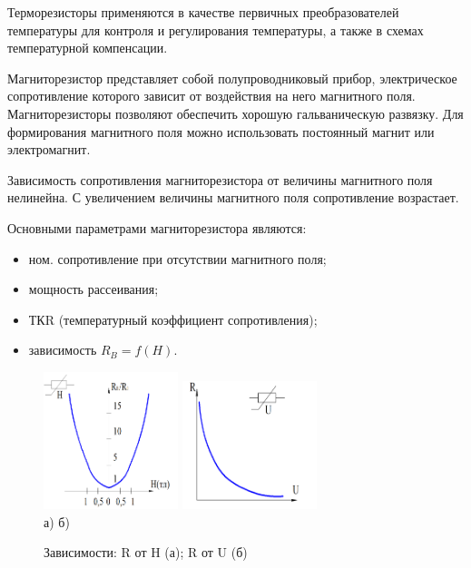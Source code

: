 \documentclass[unicode, 12pt, a4paper, oneside]{article}
\begin{document}
Терморезисторы применяются в качестве первичных преобразователей температуры для контроля и регулирования температуры, а также в схемах температурной компенсации.

Магниторезистор представляет собой полупроводниковый прибор, электрическое сопротивление которого зависит от воздействия на него магнитного поля. Магниторезисторы позволяют обеспечить хорошую гальваническую развязку. Для формирования магнитного поля можно использовать постоянный магнит или электромагнит.

Зависимость сопротивления магниторезистора от величины магнитного поля нелинейна. С увеличением величины магнитного поля сопротивление возрастает.

Основными параметрами магниторезистора являются:
\begin{itemize}
\item ном. сопротивление при отсутствии магнитного поля;
\item мощность рассеивания;
\item ТКR (температурный коэффициент сопротивления);
\item зависимость $R_{B} = f(H)$.
\end{itemize}


\begin{figure}[H]
\centering
\includegraphics[width=0.35\textwidth]{4_R(H).png}
\hspace{1cm}
\includegraphics[width=0.35\textwidth]{4_R(U).png}
\\а) \hspace{0.4\textwidth} б)
\caption{Зависимости: R от H (а); R от U (б)}
\label{fig:4_R(U/H)}
\end{figure}
\end{document}
